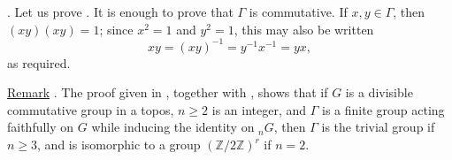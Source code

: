 \smallskip
\noindent
{}. Let us prove .  It is enough to prove that $\Gamma$ is
commutative.  If $x,y\in\Gamma$, then $(xy)(xy)=1$; since $x^2=1$ and
$y^2=1$, this may also be written
\[
 xy=(xy)^{-1}=y^{-1}x^{-1}=yx,
\]
as required.

\medskip
\noindent
\underline{Remark} . The proof given in , together with
, shows that if $G$ is a divisible commutative group in a topos,
$n\geq2$ is an integer, and $\Gamma$ is a finite group acting faithfully
on $G$ while inducing the identity on ${}_nG$, then $\Gamma$ is the
trivial group if $n\geq3$, and is isomorphic to a group
$(\mathbb Z/2\mathbb Z)^r$ if $n=2$.
